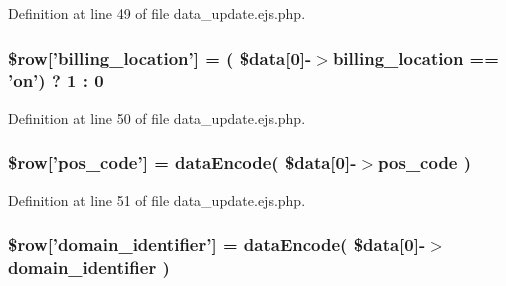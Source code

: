 \-Definition at line 49 of file data\-\_\-update.\-ejs.\-php.

\hypertarget{patientfile_2immnunization_2data__update_8ejs_8php_a65028e126c36dd80a9536adb4a71e013}{
\subsubsection[{\$row}]{\setlength{\rightskip}{0pt plus 5cm}\$row\mbox{[}'billing\-\_\-location'\mbox{]} = ( \$data\mbox{[}0\mbox{]}-\/$>$billing\-\_\-location == 'on') ? 1 \-: 0}}\label{patientfile_2immnunization_2data__update_8ejs_8php_a65028e126c36dd80a9536adb4a71e013}


\-Definition at line 50 of file data\-\_\-update.\-ejs.\-php.

\hypertarget{patientfile_2immnunization_2data__update_8ejs_8php_a356c4da2469428341dbff416200baee5}{
\subsubsection[{\$row}]{\setlength{\rightskip}{0pt plus 5cm}\$row\mbox{[}'pos\-\_\-code'\mbox{]} = {\bf data\-Encode}( \$data\mbox{[}0\mbox{]}-\/$>$pos\-\_\-code )}}\label{patientfile_2immnunization_2data__update_8ejs_8php_a356c4da2469428341dbff416200baee5}


\-Definition at line 51 of file data\-\_\-update.\-ejs.\-php.

\hypertarget{patientfile_2immnunization_2data__update_8ejs_8php_a1c503dc6be7e45d4cce60426e0dc6c16}{
\subsubsection[{\$row}]{\setlength{\rightskip}{0pt plus 5cm}\$row\mbox{[}'domain\-\_\-identifier'\mbox{]} = {\bf data\-Encode}( \$data\mbox{[}0\mbox{]}-\/$>$domain\-\_\-identifier )}}\label{patientfile_2immnunization_2data__update_8ejs_8php_a1c503dc6be7e45d4cce60426e0dc6c16}


